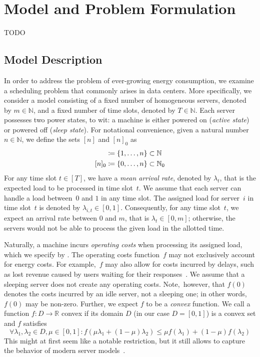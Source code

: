 
\chapter{Model and Problem Formulation}
TODO

\section{Model Description}\label{sec:model_descr}
In order to address the problem of ever-growing energy consumption, we examine a scheduling problem that commonly arises in data centers. More specifically, we consider a model consisting of a fixed number of homogeneous servers, denoted by $m\in\mathbb{N}$, and a fixed number of time slots, denoted by $T\in\mathbb{N}$. Each server possesses two power states, to wit: a machine is either powered on (\emph{active state}) or powered off (\emph{sleep state}). For notational convenience, given a natural number $n\in\mathbb{N}$, we define the sets $[n]$ and $[n]_0$ as
\begin{align*}
	[n]&\coloneqq\fromto{1}{n}\subset\mathbb{N}\\
	[n]_0&\coloneqq\fromto{0}{n}\subset\mathbb{N}_0
\end{align*}
For any time slot $t\in[T]$, we have a \emph{mean arrival rate}, denoted by $\lambda_t$, that is the expected load to be processed in time slot~$t$. We assume that each server can handle a load between~$0$ and $1$ in any time slot. The assigned load for server~$i$ in time slot~$t$ is denoted by $\lambda_{i,t}\in[0,1]$. Consequently, for any time slot~$t$, we expect an arrival rate between $0$ and $m$, that is $\lambda_t\in[0,m]$; otherwise, the servers would not be able to process the given load in the allotted time.

Naturally, a machine incurs \emph{operating costs} when processing its assigned load, which we specify by . The operating costs function~$f$ may not exclusively account for energy costs. For example,~$f$ may also allow for costs incurred by delays, such as lost revenue caused by users waiting for their responses~\parencite{dyn-right-sizing}\parencite{geo-load-balancing}. We assume that a sleeping server does not create any operating costs. Note,~however, that $f(0)$ denotes the costs incurred by an idle server, not a sleeping one; in other words, $f(0)$ may be non-zero. Further, we expect $f$ to be a \emph{convex} function. We call a function $f:D\rightarrow\mathbb{R}$ convex if its domain $D$ (in our case $D=[0,1]$) is a convex set and $f$ satisfies
\begin{equation}\label{eq:convex_condition}
	\forall \lambda_1,\lambda_2\in D,\mu\in[0,1]:f(\mu\lambda_1+(1-\mu)\lambda_2)\le\mu f(\lambda_1)+(1-\mu)f(\lambda_2)
\end{equation}
This might at first seem like a notable restriction, but it still allows to capture the behavior of modern server models~\parencite{bansal-soco}\parencite{dyn-right-sizing}.

